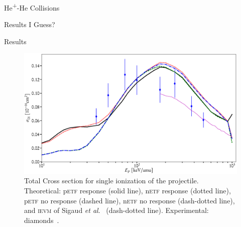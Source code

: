 \documentclass[letterpaper, 11 pt]{report}
\begin{document}
\begin{chapter}{\texorpdfstring{He\textsuperscript{+}}{He+}-He Collisions \label{chap:hephe}}
\begin{section}{Results I Guess? \label{sec:hephe-disc}}
\begin{subsection}{Results \label{sec:hephe-res}}
         \begin{figure}[t]
            \centering
            \includegraphics[width = \linewidth]{./images/hephe-cross/HepHe-201.eps}
            \caption[Total Cross section for single ionization of the projectile in
                     He\textsuperscript{+}-He collisions.]
                    {Total Cross section for single ionization of the projectile.
                     Theoretical: p\textsc{etf} response (solid line), n\textsc{etf} response
                                  (dotted line),
                                  p\textsc{etf} no response (dashed line), n\textsc{etf} no response
                                  (dash-dotted line), and
                                  \textsc{ievm} of Sigaud \textit{et al}.~\cite{SM-03} (dash-dotted
                                  line).
                     Experimental: diamonds~\cite{Dub-89}. \label{fig:cs201}}
         \end{figure}
 

\end{subsection}
\end{section}
\end{chapter}
\end{document}

